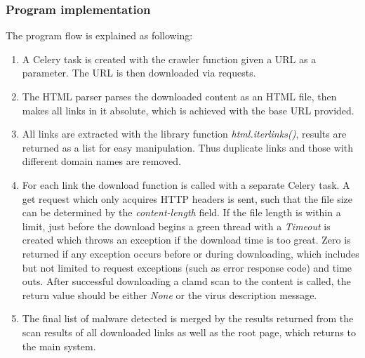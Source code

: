 \subsubsection{Program implementation}
The program flow is explained as following:
\begin{enumerate}
\item A Celery task is created with the crawler function given a URL as a 
parameter. The URL is then downloaded via requests. 

\item The HTML parser parses the downloaded content as an HTML file, then makes 
all links in it absolute, which is achieved with the base URL provided. 

\item All links are extracted with the library function {\em html.iterlinks()}, 
results are returned as a list for easy manipulation. Thus duplicate links and 
those with different domain names are removed.

\item For each link the download function is called with a separate Celery 
task. A get request which only acquires HTTP headers is sent, such that the file size can be determined by the 
{\em content-length} field. If the file length is within a limit, just before 
the download begins a green thread with a {\em Timeout} is created which throws 
an exception if the download time is too great. Zero is returned if any exception 
occurs before or during downloading, which includes but not limited to request 
exceptions (such as error response code) and time outs. After successful 
downloading a clamd scan to the content is called, the return value should be 
either {\em None} or the virus description message. 

\item The final list of malware detected is merged by the results 
returned from the scan results of all downloaded links as well as the root 
page, which returns to the main system.  
\end{enumerate}
